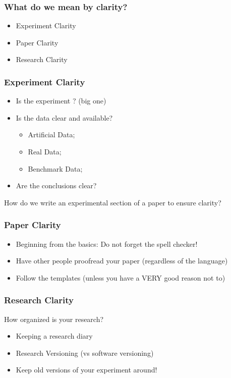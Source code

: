 \documentclass[10pt]{beamer}
\begin{document}
\begin{frame}
  \frametitle{What do we mean by clarity?}
  \begin{itemize}
  \item Experiment Clarity
  \item Paper Clarity
  \item Research Clarity
  \end{itemize}
\end{frame}

\begin{frame}
  \frametitle{Experiment Clarity}

  \begin{itemize}
  \item Is the experiment ? (big one)
  \item Is the data clear and available?
    \begin{itemize}
    \item Artificial Data;
    \item Real Data;
    \item Benchmark Data;
    \end{itemize}
  \item Are the conclusions clear?
  \end{itemize}

  \bigskip

  How do we write an experimental section of a paper to ensure clarity?
\end{frame}

\begin{frame}
  \frametitle{Paper Clarity}
  \begin{itemize}
  \item Beginning from the basics: Do not forget the spell checker!
  \item Have other people proofread your paper (regardless of the language)
  \item Follow the templates (unless you have a VERY good reason not to)
  \end{itemize}
\end{frame}

\begin{frame}
  \frametitle{Research Clarity}
  How organized is your research?
  \begin{itemize}
    \item Keeping a research diary
    \item Research Versioning (vs software versioning)
    \item Keep old versions of your experiment around!
  \end{itemize}
\end{frame}
\end{document}

